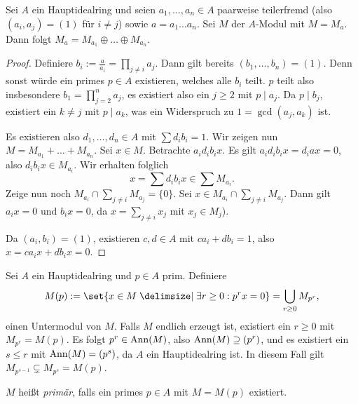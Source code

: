 \documentclass[12pt,a4paper]{scrartcl}
\theoremstyle{cplain}
\theoremstyle{cdef}
\begin{document}
\begin{lem} \label{lem:zerlegung ueber hir}
	Sei $A$ ein Hauptidealring und seien $a_1,\dots, a_n\in A$ paarweise teilerfremd (also $(a_i, a_j) = (1)$ für $i \neq j$) sowie $a = a_1\dots a_n$. Sei $M$ der $A$-Modul mit $M = M_a$. Dann folgt $M_a = M_{a_1}\oplus \dots \oplus M_{a_n}$.
\end{lem}
\begin{proof}
	Definiere $b_i := \frac{a}{a_i} = \prod_{j\neq i} a_j$. Dann gilt bereits $(b_1,\dots, b_n) = (1)$. Denn sonst würde ein primes $p\in A$ existieren, welches alle $b_i$ teilt. $p$ teilt also insbesondere $b_1 = \prod_{j = 2}^n a_j$, es existiert also ein $j\ge 2$ mit $p \mid a_j$. Da $p \mid b_j$, existiert ein $k\neq j$ mit $p \mid a_k$, was ein Widerspruch zu $1 = \gcd(a_j,a_k)$ ist.
	
	Es existieren also $d_1,\dots, d_n\in A$ mit $\sum d_ib_i = 1$. Wir zeigen nun $M = M_{a_1}+\dots +M_{a_n}$. Sei $x\in M$. Betrachte $a_id_ib_ix$. Es gilt $a_id_ib_ix = d_iax = 0$, also $d_ib_ix\in M_{a_i}$. Wir erhalten folglich \[ x = \sum d_ib_ix \in \sum M_{a_i}. \]
	Zeige nun noch $M_{a_i}\cap \sum_{j\neq i}M_{a_j} = \{0\}$. Sei $x\in M_{a_i}\cap\sum_{j \neq i}M_{a_j}$. Dann gilt $a_ix = 0$ und $b_ix = 0$, da $x = \sum_{j \neq i} x_j$ mit $x_j\in M_j$).
	
	Da $(a_i,b_i)= (1)$, existieren $c,d\in A$ mit $ca_i+db_i = 1$, also $x = ca_ix+db_ix = 0$.
\end{proof}

\begin{defi}
	Sei $A$ ein Hauptidealring und $p\in A$ prim. Definiere
	\[M(p) := \set{x\in M \given \exists r\ge 0: p^rx = 0} = \bigcup\limits_{r\ge 0} M_{p^r}, \]
	einen Untermodul von $M$. Falls $M$ endlich erzeugt ist, existiert ein $r\ge 0$ mit $M_{p^r} = M(p)$. Es folgt $p^r\in \operatorname{Ann}(M)$, also $\operatorname{Ann}(M)\supseteq (p^r)$, und es existiert ein $s\le r$ mit $\operatorname{Ann}(M) = (p^s)$, da $A$ ein Hauptidealring ist. In diesem Fall gilt $M_{p^{s-1}}\subsetneq M_{p^s} = M(p)$.
	
	$M$ heißt \emph{primär}, falls ein primes $p\in A$ mit $M = M(p)$ existiert.
\end{defi}	
\end{document}
